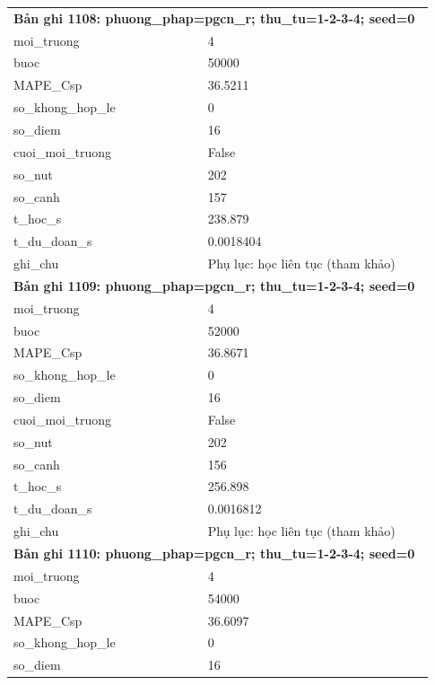 \begin{longtable}{p{0.43\linewidth}p{0.50\linewidth}}
\midrule
\multicolumn{2}{p{0.95\linewidth}}{\textbf{Bản ghi 1108: phuong\_phap=pgcn\_r; thu\_tu=1-2-3-4; seed=0}} \\
moi\_\allowbreak truong & 4 \\
buoc & 50000 \\
MAPE\_\allowbreak Csp & 36.5211 \\
so\_\allowbreak khong\_\allowbreak hop\_\allowbreak le & 0 \\
so\_\allowbreak diem & 16 \\
cuoi\_\allowbreak moi\_\allowbreak truong & False \\
so\_\allowbreak nut & 202 \\
so\_\allowbreak canh & 157 \\
t\_\allowbreak hoc\_\allowbreak s & 238.879 \\
t\_\allowbreak du\_\allowbreak doan\_\allowbreak s & 0.0018404 \\
ghi\_\allowbreak chu & Phụ lục: học liên tục (tham khảo) \\
\midrule
\multicolumn{2}{p{0.95\linewidth}}{\textbf{Bản ghi 1109: phuong\_phap=pgcn\_r; thu\_tu=1-2-3-4; seed=0}} \\
moi\_\allowbreak truong & 4 \\
buoc & 52000 \\
MAPE\_\allowbreak Csp & 36.8671 \\
so\_\allowbreak khong\_\allowbreak hop\_\allowbreak le & 0 \\
so\_\allowbreak diem & 16 \\
cuoi\_\allowbreak moi\_\allowbreak truong & False \\
so\_\allowbreak nut & 202 \\
so\_\allowbreak canh & 156 \\
t\_\allowbreak hoc\_\allowbreak s & 256.898 \\
t\_\allowbreak du\_\allowbreak doan\_\allowbreak s & 0.0016812 \\
ghi\_\allowbreak chu & Phụ lục: học liên tục (tham khảo) \\
\midrule
\multicolumn{2}{p{0.95\linewidth}}{\textbf{Bản ghi 1110: phuong\_phap=pgcn\_r; thu\_tu=1-2-3-4; seed=0}} \\
moi\_\allowbreak truong & 4 \\
buoc & 54000 \\
MAPE\_\allowbreak Csp & 36.6097 \\
so\_\allowbreak khong\_\allowbreak hop\_\allowbreak le & 0 \\
so\_\allowbreak diem & 16 \\

\end{longtable}

